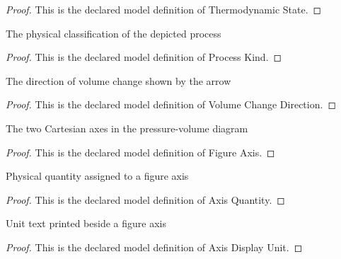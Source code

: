 \begin{proof}
  This is the declared model definition of Thermodynamic State.
\end{proof}
\begin{definition}
  \label{def:physics:phyx-mini-0403:phyxminiproblems-problemphyxmini0403-processkind}
  The physical classification of the depicted process
\end{definition}
\begin{proof}
  This is the declared model definition of Process Kind.
\end{proof}
\begin{definition}
  \label{def:physics:phyx-mini-0403:phyxminiproblems-problemphyxmini0403-volumechangedirection}
  The direction of volume change shown by the arrow
\end{definition}
\begin{proof}
  This is the declared model definition of Volume Change Direction.
\end{proof}
\begin{definition}
  \label{def:physics:phyx-mini-0403:phyxminiproblems-problemphyxmini0403-figureaxis}
  The two Cartesian axes in the pressure-volume diagram
\end{definition}
\begin{proof}
  This is the declared model definition of Figure Axis.
\end{proof}
\begin{definition}
  \label{def:physics:phyx-mini-0403:phyxminiproblems-problemphyxmini0403-axisquantity}
  Physical quantity assigned to a figure axis
\end{definition}
\begin{proof}
  This is the declared model definition of Axis Quantity.
\end{proof}
\begin{definition}
  \label{def:physics:phyx-mini-0403:phyxminiproblems-problemphyxmini0403-axisdisplayunit}
  Unit text printed beside a figure axis
\end{definition}
\begin{proof}
  This is the declared model definition of Axis Display Unit.
\end{proof}
